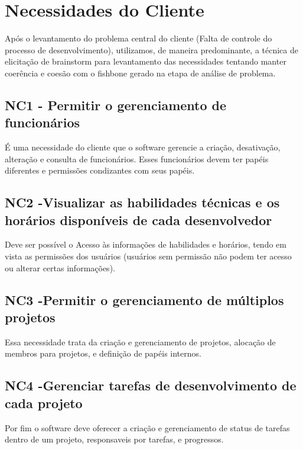 \chapter{Necessidades do Cliente}
\label{sec:nc}

Após o levantamento do problema central do cliente (Falta de controle do processo de desenvolvimento), utilizamos, de maneira predominante, a técnica de elicitação de brainstorm para levantamento das necessidades tentando manter coerência e coesão com o fishbone gerado na etapa de análise de problema.

\section{NC1 - Permitir o gerenciamento de funcionários}

É uma necessidade do cliente que o software gerencie a criação, desativação, alteração e consulta de funcionários. Esses funcionários devem ter papéis diferentes e permissões condizantes com seus papéis. 
\section{NC2 -Visualizar as habilidades técnicas e os horários disponíveis de cada desenvolvedor}

Deve ser possível o Acesso às informações de habilidades e horários, tendo em vista as permissões dos usuários (usuários sem permissão não podem ter acesso ou alterar certas informações).

\section{NC3 -Permitir o gerenciamento de múltiplos projetos}

Essa necessidade trata da criação e gerenciamento de projetos, alocação de membros para projetos, e definição de papéis internos.

\section{NC4 -Gerenciar tarefas de desenvolvimento de cada projeto}

Por fim o software deve oferecer a criação e gerenciamento de status de tarefas dentro de um projeto, responsaveis por tarefas, e progressos.
